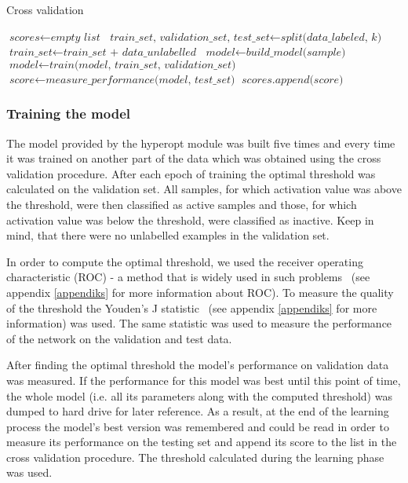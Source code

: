 \documentclass[a4paper,10pt]{report}
\begin{document}
	\begin{algorithm}
	\caption{Cross validation}\label{alg:cross_validation}
	\begin{algorithmic}[1]
	\State
	\State $\textit{scores} \gets \textit{empty list}$
	\State
	  \State $\textit{train\_set, validation\_set, test\_set} \gets \textit{split(data\_labeled, k)} $
	  \State $\textit{train\_set} \gets \textit{train\_set + data\_unlabelled}$
	  \State $\textit{model} \gets \textit{build\_model(sample)}$
	  \State $\textit{model} \gets \textit{train(model, train\_set, validation\_set)}$
	  \State $\textit{score} \gets \textit{measure\_performance(model, test\_set)}$
	  \State $\textit{scores.append(score)}$
	\EndFor
	\State       
	\State
	\EndProcedure
	\end{algorithmic}
	\end{algorithm}
	
	\subsubsection{Training the model}
	The model provided by the hyperopt module was built five times and every time it was trained on another part of the data which was obtained using the cross validation procedure. After each epoch of training the optimal threshold was calculated on the validation set. All samples, for which activation value was above the threshold, were then classified as active samples and those, for which activation value was below the threshold, were classified as inactive. Keep in mind, that there were no unlabelled examples in the validation set.
	
	In order to compute the optimal threshold, we used the receiver operating characteristic (ROC) - a method that is widely used in such problems~\cite{ROC_1, ROC_EF} (see appendix \ref{appendiks} for more information about ROC). To measure the quality of the threshold the Youden's J statistic~\cite{YOUDEN} (see appendix \ref{appendiks} for more information) was used. The same statistic was used to measure the performance of the network on the validation and test data.
	
	After finding the optimal threshold the model's performance on validation data was measured. If the performance for this model was best until this point of time, the whole model (i.e. all its parameters along with the computed threshold) was dumped to hard drive for later reference. As a result, at the end of the learning process the model's best version was remembered and could be read in order to measure its performance on the testing set and append its score to the list in the cross validation procedure. The threshold calculated during the learning phase was used.
	
\end{document}

